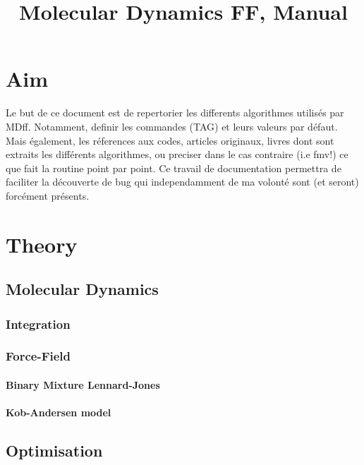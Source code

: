 \documentclass[a4paper]{article}
\title{Molecular Dynamics FF, Manual }
\newcommand{\MDFF}{{\sc MDff}}
\newcommand{\FMV}{{\sc fmv}}
\begin{document}
\maketitle
\clearpage
\tableofcontents

\clearpage

\section{Aim}

Le but de ce document est de repertorier les differents 
algorithmes utilis\'es par \MDFF. Notamment, definir les 
commandes (TAG) et leurs valeurs par défaut. Mais également, 
les r\'eferences aux codes, articles originaux, livres dont 
sont extraits les diff\'erents algorithmes, ou preciser dans 
le cas contraire (i.e \FMV!) ce que fait la routine point par point. 
Ce travail de documentation permettra de faciliter la d\'ecouverte
de bug qui independamment de ma volont\'e sont (et seront) 
forc\'ement pr\'esents. 

\clearpage

\section{Theory}

\subsection{Molecular Dynamics\label{sec:MD}}
\subsubsection{Integration\label{sec:integrator}}
\subsubsection{Force-Field}
\paragraph{Binary Mixture Lennard-Jones\label{sec:BMLJ}}
\paragraph{Kob-Andersen model\label{sec:KA}}


\subsection{Optimisation\label{sec:OPT}}
\end{document}
